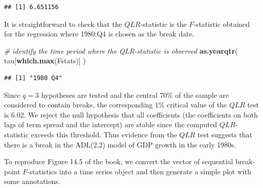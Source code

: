 \documentclass[]{book}
\newenvironment{Shaded}{\begin{snugshade}}{\end{snugshade}}
\newcommand{\KeywordTok}[1]{\textcolor[rgb]{0.13,0.29,0.53}{\textbf{#1}}}
\newcommand{\CommentTok}[1]{\textcolor[rgb]{0.56,0.35,0.01}{\textit{#1}}}
\newcommand{\NormalTok}[1]{#1}
\theoremstyle{definition}
\theoremstyle{definition}
\theoremstyle{definition}
\theoremstyle{remark}
\begin{document}
\begin{verbatim}
## [1] 6.651156
\end{verbatim}

It is straightforward to check that the \(QLR\)-statistic is the
\(F\)-statistic obtained for the regression where 1980:Q4 is chosen as
the break date.

\begin{Shaded}
\begin{Highlighting}[]
\CommentTok{# identify the time period where the QLR-statistic is observed}
\KeywordTok{as.yearqtr}\NormalTok{(}
\NormalTok{  tau[}\KeywordTok{which.max}\NormalTok{(Fstats)]}
\NormalTok{)}
\end{Highlighting}
\end{Shaded}

\begin{verbatim}
## [1] "1980 Q4"
\end{verbatim}

Since \(q=3\) hypotheses are tested and the central \(70\%\) of the
sample are considered to contain breaks, the corresponding \(1\%\)
critical value of the \(QLR\) test is \(6.02\). We reject the null
hypothesis that all coefficients (the coefficients on both lags of term
spread and the intercept) are stable since the computed
\(QLR\)-statistic exceeds this threshold. Thus evidence from the \(QLR\)
test suggests that there is a break in the ADL(\(2\),\(2\)) model of GDP
growth in the early 1980s.

To reproduce Figure 14.5 of the book, we convert the vector of
sequential break-point \(F\)-statistics into a time series object and
then generate a simple plot with some annotations.
\end{document}
